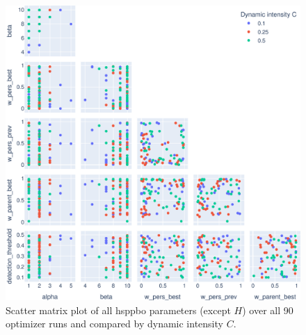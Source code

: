 \begin{figure}[h]
	\centering
	\includegraphics[width=\textwidth]{results/part2/param_scatter_matrix_dynamic.svg}
	\caption[Scatter matrix plot of all \gls{hsppbo} parameters compared by dynamic intensity]{Scatter matrix plot of all \gls{hsppbo} parameters (except $H$) over all 90 optimizer runs and compared by dynamic intensity $C$.}
	\label{fig:parameter_scatter_matrix_dynamic}
\end{figure}


